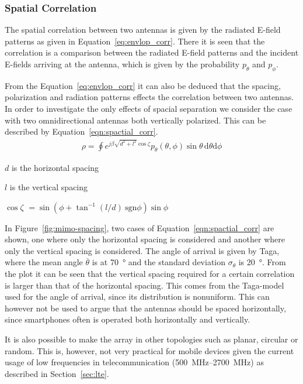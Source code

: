 \subsubsection{Spatial Correlation}
The spatial correlation between two antennas is given by the radiated E-field patterns as given in Equation~\ref{eq:envlop_corr}. There it is seen that the correlation is a comparison between the radiated E-field patterns and the incident E-fields arriving at the antenna, which is given by the probability $p_\theta$ and $p_\phi$. 

From the Equation~\ref{eq:envlop_corr} it can also be deduced that the spacing, polarization and radiation patterns effects the correlation between two antennas. In order to investigate the only effects of spacial separation we consider the case with two omnidirectional antennas both vertically polarized. This can be described by Equation~\ref{eqn:spactial_corr}\cite{Tim2012Practical}.
\begin{align}
\label{eqn:spactial_corr}
  \rho = \oint e^{j\beta \sqrt{d^2+l^2}\cos\zeta}p_\theta(\theta,\phi)\sin\theta \, \mathrm{d} \theta \mathrm{d} \phi
\end{align}
\begin{where}
\item[$d$] is the horizontal spacing
\item[$l$] is the vertical spacing
\item[$\cos \zeta$] $= \sin(\phi + \tan^{-1}(l/d)\ \text{sgn}\phi)\sin\phi$   
\end{where}

In Figure~\ref{fig:mimo-spacing}, two cases of Equation~\ref{eqn:spactial_corr} are shown, one where only the horizontal spacing is considered and another where only the vertical spacing is considered. The angle of arrival is given by Taga, where the mean angle $\overline{\theta}$ is at \SI{70}{\degree} and the standard deviation $\sigma_\theta$ is \SI{20}{\degree}. From the plot it can be seen that the vertical spacing required for a certain correlation is larger than that of the horizontal spacing. This comes from the Taga-model used for the angle of arrival, since its distribution is nonuniform. This can however not be used to argue that the antennas should be spaced horizontally, since smartphones often is operated both horizontally and vertically. 

It is also possible to make the array in other topologies such as planar, circular or random. This is, however, not very practical for mobile devices given the current usage of low frequencies in telecommunication (\SIrange{500}{2700}{MHz}) as described in Section~\ref{sec:lte}.

